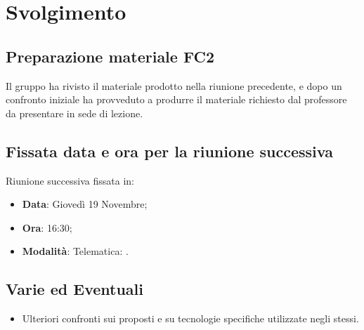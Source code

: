 \documentclass[]{article}
\begin{document}
	\newpage
	
	\section{Svolgimento}
		\subsection{Preparazione materiale FC2}
		Il gruppo ha rivisto il materiale prodotto nella riunione precedente, e dopo un confronto iniziale ha provveduto a produrre il materiale richiesto dal professore da presentare in sede di lezione.\\
		 
		\subsection{Fissata data e ora per la riunione successiva}
		Riunione successiva fissata in:
		\begin{itemize}
			\item \textbf{Data}: Giovedì 19 Novembre;
			\item \textbf{Ora}: 16:30;
			\item \textbf{Modalità}: Telematica: .\\
		\end{itemize}
		
		\subsection{Varie ed Eventuali}
		\begin{itemize}
			\item Ulteriori confronti sui  proposti e su tecnologie specifiche utilizzate negli stessi.
		\end{itemize}
  
\end{document}
